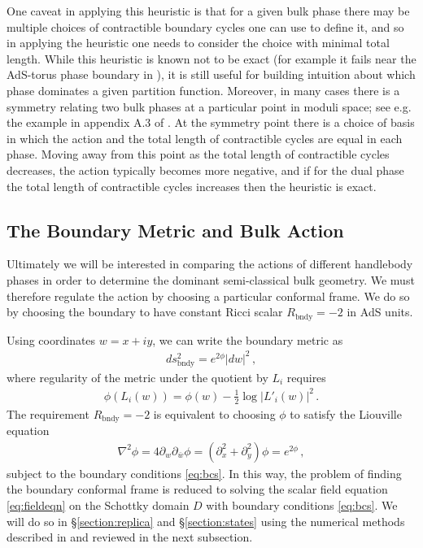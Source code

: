 \documentclass[letterpaper,12pt]{article}
\newcommand{\ban}[1]{\begin{align}#1\end{align}}
\begin{document}
One caveat in applying this heuristic is that for a given bulk phase there may be multiple choices of contractible boundary cycles one can use to define it, and so in applying the heuristic one needs to consider the choice with minimal total length. While this heuristic is known not to be exact (for example it fails near the AdS-torus phase boundary in \cite{MRW}), it is still useful for building intuition about which phase dominates a given partition function. Moreover, in many cases there is a symmetry relating two bulk phases at a particular point in moduli space; see e.g. the example in appendix A.3 of \cite{MBW1}. At the symmetry point there is a choice of basis in which the action and the total length of contractible cycles are equal in each phase. Moving away from this point as the total length of contractible cycles decreases, the action typically becomes more negative, and if for the dual phase the total length of contractible cycles increases then the heuristic is exact.


\subsection{The Boundary Metric and Bulk Action}

Ultimately we will be interested in comparing the actions of different handlebody phases in order to determine the dominant semi-classical bulk geometry. We must therefore regulate the action by choosing a particular conformal frame. We do so by choosing the boundary to have constant Ricci scalar $R_\text{bndy} = -2$ in AdS units.

Using coordinates $w= x + i y$, we can write the boundary metric as
\ban{
ds^2_\text{bndy} = e^{2\phi} |dw|^2\, ,
}
where regularity of the metric under the quotient by $L_i$ requires
\ban{
\phi(L_i(w)) = \phi(w) -\frac 12 \log \left| L'_i(w)\right|^2 \label{eq:bcs} \, .
}
The requirement $R_\text{bndy}=-2$ is equivalent to choosing $\phi$ to satisfy the Liouville equation
\ban{
\nabla^2 \phi = 4 \partial_w \partial_{\bar w}\phi = (\partial_x^2 + \partial_y^2) \phi = e^{2\phi} \label{eq:fieldeqn}\, ,
}
subject to the boundary conditions \eqref{eq:bcs}. In this way, the problem of finding the boundary conformal frame is reduced to solving the scalar field equation \eqref{eq:fieldeqn} on the Schottky domain $D$ with boundary conditions \eqref{eq:bcs}. We will do so in \S\ref{section:replica} and \S\ref{section:states} using the numerical methods described in \cite{MRW} and reviewed in the next subsection.
\end{document}
